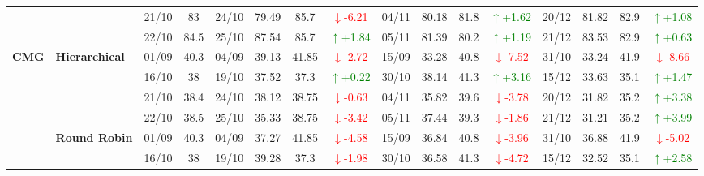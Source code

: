 \documentclass{ieeeaccess}
\begin{document}
{\begin{longtable}{llcc|cccc|cccc|cccc}
&
& 21/10 & 83 & 24/10 & 79.49 & 85.7 & \textcolor{red}{\(\downarrow\)-6.21} & 04/11 & 80.18 & 81.8 & \textcolor{green}{\(\uparrow\)+1.62} & 20/12 & 81.82 & 82.9 & \textcolor{green}{\(\uparrow\)+1.08} \\

&
& 22/10 & 84.5 & 25/10 & 87.54 & 85.7 & \textcolor{green}{\(\uparrow\)+1.84} & 05/11 & 81.39 & 80.2 & \textcolor{green}{\(\uparrow\)+1.19} & 21/12 & 83.53 & 82.9 & \textcolor{green}{\(\uparrow\)+0.63} \\
\midrule






\multirow{12}{*}{\textbf{CMG}} 
& \textbf{Hierarchical}
& 01/09 & 40.3 & 04/09 & 39.13 & 41.85 & \textcolor{red}{\(\downarrow\)-2.72} & 15/09 & 33.28 & 40.8 & \textcolor{red}{\(\downarrow\)-7.52} & 31/10 & 33.24 & 41.9 & \textcolor{red}{\(\downarrow\)-8.66} \\

& 
& 16/10 & 38 & 19/10 & 37.52 & 37.3 & \textcolor{green}{\(\uparrow\)+0.22} & 30/10 & 38.14 & 41.3 & \textcolor{green}{\(\uparrow\)+3.16} & 15/12 & 33.63 & 35.1 & \textcolor{green}{\(\uparrow\)+1.47} \\

& 
& 21/10 & 38.4 & 24/10 & 38.12 & 38.75 & \textcolor{red}{\(\downarrow\)-0.63} & 04/11 & 35.82 & 39.6 & \textcolor{red}{\(\downarrow\)-3.78} & 20/12 & 31.82 & 35.2 & \textcolor{green}{\(\uparrow\)+3.38} \\

&
& 22/10 & 38.5 & 25/10 & 35.33 & 38.75 & \textcolor{red}{\(\downarrow\)-3.42} & 05/11 & 37.44 & 39.3 & \textcolor{red}{\(\downarrow\)-1.86} & 21/12 & 31.21 & 35.2 & \textcolor{green}{\(\uparrow\)+3.99} \\
\cmidrule(lr){2-16}


& \textbf{Round Robin}
& 01/09 & 40.3 & 04/09 & 37.27 & 41.85 & \textcolor{red}{\(\downarrow\)-4.58} & 15/09 & 36.84 & 40.8 & \textcolor{red}{\(\downarrow\)-3.96} & 31/10 & 36.88 & 41.9 & \textcolor{red}{\(\downarrow\)-5.02} \\

& 
& 16/10 & 38 & 19/10 & 39.28 & 37.3 & \textcolor{red}{\(\downarrow\)-1.98} & 30/10 & 36.58 & 41.3 & \textcolor{red}{\(\downarrow\)-4.72} & 15/12 & 32.52 & 35.1 & \textcolor{green}{\(\uparrow\)+2.58} \\


\end{longtable}}
\end{document}
